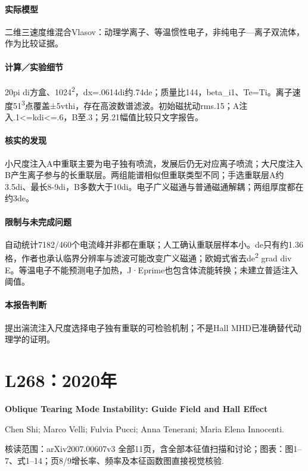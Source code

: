 \documentclass[UTF8,a4paper,11pt,openany,fontset=fandol]{ctexbook}
\begin{document}
\paragraph{实际模型}二维三速度维混合Vlasov：动理学离子、等温惯性电子，非纯电子—离子双流体，作为比较证据。

\paragraph{计算／实验细节}20pi di方盒、1024\textsuperscript{2}，dx=.0614di约.74de；质量比144，beta\_i1、Te=Ti。离子速度51\textsuperscript{3}点覆盖±5vthi，存在高波数谱滤波。初始磁扰动rms.15；A注入.1<=kdi<=.6，B至.3；另.21幅值比较只文字报告。

\paragraph{核实的发现}小尺度注入A中重联主要为电子独有喷流，发展后仍无对应离子喷流；大尺度注入B产生离子参与的长重联层。两组能谱相似但重联类型不同；手选重联层A约3.5di、最长8-9di，B多数大于10di。电子广义磁通与普通磁通解耦；两组厚度都在约3de。

\paragraph{限制与未完成问题}自动统计7182/460个电流峰并非都在重联；人工确认重联层样本小。de只有约1.36格，作者也承认临界分辨率与滤波可能改变广义磁通；欧姆式省去de\textsuperscript{2} grad div E。等温电子不能预测电子加热，J·Eprime也包含体流能转换；未建立普适注入阈值。

\paragraph{本报告判断}提出湍流注入尺度选择电子独有重联的可检验机制；不是Hall MHD已准确替代动理学的证明。

\section{L268：2020年}\label{paper:L268}

\textbf{Oblique Tearing Mode Instability: Guide Field and Hall Effect}\citep{L268}\

Chen Shi;  Marco Velli;  Fulvia Pucci;  Anna Tenerani;  Maria Elena Innocenti.

\textsf{核读范围：}arXiv2007.00607v3 全部11页，含全部本征值扫描和讨论；\textsf{图表：}图1–7、式1–14；页8/9增长率、频率及本征函数图直接视觉核验.
\end{document}
